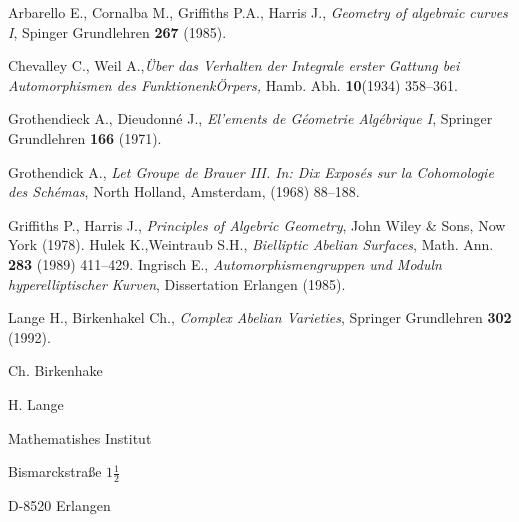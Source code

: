 \begin{thebibliography}{99}
 Arbarello E., Cornalba M., Griffiths P.A., Harris J., \textit{Geometry of algebraic curves I}, Spinger Grundlehren {\bf 267} (1985).

 Chevalley C., Weil A.,\textit{\"Uber das Verhalten der Integrale erster Gattung bei Automorphismen des Funktionenk\"Orpers,} Hamb. Abh. {\bf 10}(1934) 358--361.

 Grothendieck A., Dieudonn\'e J., \textit{El'ements de G\'eometrie Alg\'ebrique I}, Springer Grundlehren {\bf 166} (1971).

 Grothendick A., \textit{Let Groupe de Brauer III. In: Dix Expos\'es sur la Cohomologie des Sch\'emas}, North Holland, Amsterdam, (1968) 88--188.

 Griffiths P., Harris J., \textit{Principles of Algebric Geometry}, John Wiley \& Sons, Now York (1978).
 Hulek K.,\pageoriginale Weintraub S.H., \textit{Bielliptic Abelian Surfaces}, Math. Ann. {\bf 283} (1989) 411--429.
 Ingrisch E., \textit{Automorphismengruppen und Moduln hyperelliptischer Kurven}, Dissertation Erlangen (1985).

 Lange H., Birkenhakel Ch., \textit{Complex Abelian Varieties}, Springer Grundlehren {\bf 302} (1992).
\end{thebibliography}

\begin{flushleft}
Ch. Birkenhake

H. Lange

Mathematishes Institut

Bismarckstra\ss e $1\frac{1}{2}$

D-8520 Erlangen 

\end{flushleft}
